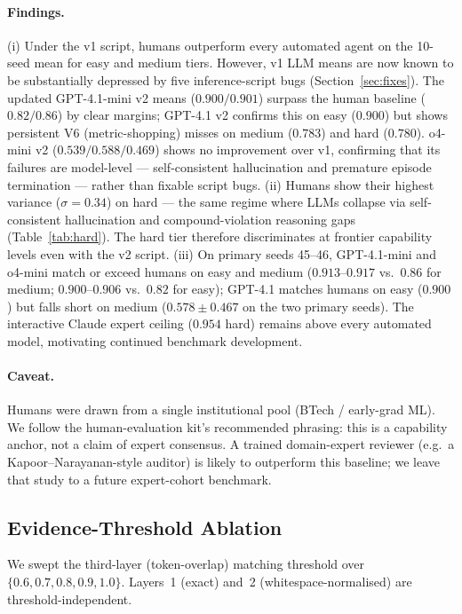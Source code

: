 \documentclass{article}
\begin{document}
\paragraph{Findings.}
(i) Under the v1 script, humans outperform every automated agent on the
10-seed mean for easy and medium tiers.  However, v1 LLM means are now
known to be substantially depressed by five inference-script bugs
(Section~\ref{sec:fixes}).  The updated GPT-4.1-mini v2 means
($0.900 / 0.901$) surpass the human baseline ($0.82 / 0.86$) by clear
margins; GPT-4.1 v2 confirms this on easy ($0.900$) but shows persistent
V6 (metric-shopping) misses on medium ($0.783$) and hard ($0.780$).
o4-mini v2 ($0.539 / 0.588 / 0.469$) shows no improvement over v1,
confirming that its failures are model-level — self-consistent
hallucination and premature episode termination — rather than fixable
script bugs.
(ii) Humans show their highest variance ($\sigma{=}0.34$) on hard ---
the same regime where LLMs collapse via self-consistent hallucination
and compound-violation reasoning gaps (Table~\ref{tab:hard}).  The hard
tier therefore discriminates at frontier capability levels even with the
v2 script.
(iii) On primary seeds 45--46, GPT-4.1-mini and o4-mini match or exceed
humans on easy and medium ($0.913$--$0.917$ vs.\ $0.86$ for medium;
$0.900$--$0.906$ vs.\ $0.82$ for easy); GPT-4.1 matches humans on easy
($0.900$) but falls short on medium ($0.578\pm0.467$ on the two primary
seeds).  The interactive Claude expert ceiling ($0.954$ hard) remains
above every automated model, motivating continued benchmark development.

\paragraph{Caveat.}
Humans were drawn from a single institutional pool (BTech / early-grad
ML).  We follow the human-evaluation kit's recommended phrasing: this is
a capability anchor, not a claim of expert consensus.  A trained
domain-expert reviewer (e.g.\ a Kapoor--Narayanan-style auditor) is
likely to outperform this baseline; we leave that study to a future
expert-cohort benchmark.

\subsection{Evidence-Threshold Ablation}
\label{sec:threshold}

We swept the third-layer (token-overlap) matching threshold over
$\{0.6, 0.7, 0.8, 0.9, 1.0\}$.  Layers~1 (exact) and~2
(whitespace-normalised) are threshold-independent.
\end{document}
